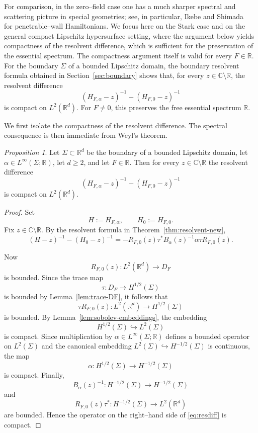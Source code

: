 \documentclass[a4paper,11pt]{article}
\numberwithin{equation}{section}
\theoremstyle{remark}
\newtheorem{prop}[lem]{Proposition}
\theoremstyle{definition}
\theoremstyle{remark}
\begin{document}
For comparison, in the zero--field case one has a much sharper spectral and scattering picture in special geometries; see, in particular, Ikebe and Shimada~\cite{IkebeShimada1991} for penetrable--wall Hamiltonians.
We focus here on the Stark case and on the general compact Lipschitz hypersurface setting, where the argument below yields compactness of the resolvent difference, which is sufficient for the preservation of the essential spectrum.
The compactness argument itself is valid for every $F\in\mathbb R$.
For the boundary $\Sigma$ of a bounded Lipschitz domain, the boundary resolvent formula obtained in Section~\ref{sec:boundary} shows that, for every $z\in\mathbb C\setminus\mathbb R$, the resolvent difference
$$
(H_{F,\alpha}-z)^{-1}-(H_{F,0}-z)^{-1}
$$
is compact on $L^2(\mathbb R^d)$.
For $F\ne0$, this preserves the free essential spectrum $\mathbb R$.

We first isolate the compactness of the resolvent difference.
The spectral consequence is then immediate from Weyl's theorem.

\begin{prop}\label{prop:compact-resolvent-difference}
Let $\Sigma\subset\mathbb R^d$ be the boundary of a bounded Lipschitz domain, let $\alpha\in L^\infty(\Sigma;\mathbb R)$, let $d\ge2$, and let $F\in\mathbb R$.
Then for every $z\in\mathbb C\setminus\mathbb R$ the resolvent difference
$$
(H_{F,\alpha}-z)^{-1}-(H_{F,0}-z)^{-1}
$$
is compact on $L^2(\mathbb R^d)$.
\end{prop}

\begin{proof}
Set
$$
H:=H_{F,\alpha},\qquad H_0:=H_{F,0}.
$$
Fix $z\in\mathbb C\setminus\mathbb R$.
By the resolvent formula in Theorem~\ref{thm:resolvent-new},
\begin{equation}\label{eq:resdiff}
(H-z)^{-1}-(H_0-z)^{-1}
=
-R_{F,0}(z)\tau^*B_\alpha(z)^{-1}
\alpha\tau R_{F,0}(z).
\end{equation}

Now
$$
R_{F,0}(z):L^2(\mathbb R^d)\to D_F
$$
is bounded.
Since the trace map
$$
\tau:D_F\to H^{1/2}(\Sigma)
$$
is bounded by Lemma~\ref{lem:trace-DF}, it follows that
$$
\tau R_{F,0}(z):L^2(\mathbb R^d)\to H^{1/2}(\Sigma)
$$
is bounded.
By Lemma~\ref{lem:sobolev-embeddings}, the embedding
$$
H^{1/2}(\Sigma)\hookrightarrow L^2(\Sigma)
$$
is compact.
Since multiplication by $\alpha\in L^\infty(\Sigma;\mathbb R)$ defines a bounded operator on $L^2(\Sigma)$ and the canonical embedding $L^2(\Sigma)\hookrightarrow H^{-1/2}(\Sigma)$ is continuous, the map
$$
\alpha:H^{1/2}(\Sigma)\to H^{-1/2}(\Sigma)
$$
is compact.
Finally,
$$
B_\alpha(z)^{-1}:H^{-1/2}(\Sigma)\to H^{-1/2}(\Sigma)
$$
and
$$
R_{F,0}(z)\tau^*:H^{-1/2}(\Sigma)\to L^2(\mathbb R^d)
$$
are bounded.
Hence the operator on the right--hand side of \eqref{eq:resdiff} is compact.
\end{proof}
\end{document}
